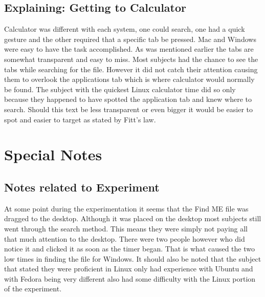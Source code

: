 \documentclass[11pt]{article}
\begin{document}
\subsection{Explaining: Getting to Calculator}
Calculator was different with each system, one could search, one had a quick gesture and the other required that a specific tab be pressed. Mac and Windows were easy to have the task accomplished. As was mentioned earlier the tabs are somewhat transparent and easy to miss. Most subjects had the chance to see the tabs while searching for the file. However it did not catch their attention causing them to overlook the applications tab which is where calculator would normally be found. The subject with the quickest Linux calculator time did so only because they happened to have spotted the application tab and knew where to search. Should this text be less transparent or even bigger it would be easier to spot and easier to target as stated by Fitt’s law.

\section{Special Notes}
\subsection{Notes related to Experiment}
At some point during the experimentation it seems that the Find ME file was dragged to the desktop. Although it was placed on the desktop most subjects still went through the search method. This means they were simply not paying all that much attention to the desktop. There were two people however who did notice it and clicked it as soon as the timer began. That is what caused the two low times in finding the file for Windows. It should also be noted that the subject that stated they were proficient in Linux only had experience with Ubuntu and with Fedora being very different also had some difficulty with the Linux portion of the experiment.
\end{document}
